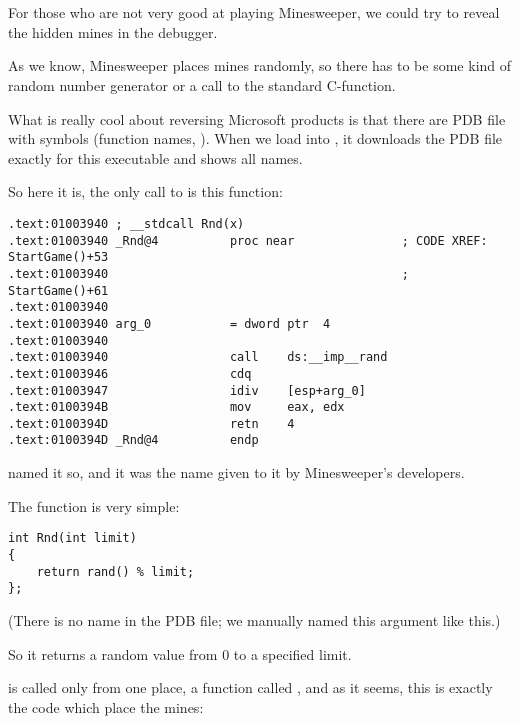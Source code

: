 \section{\MinesweeperWinXPExampleChapterName}
\label{minesweeper_winxp}

For those who are not very good at playing Minesweeper, we could try to reveal the hidden mines in the debugger.


As we know, Minesweeper places mines randomly, so there has to be some kind of random number generator or
a call to the standard  C-function.

What is really cool about reversing Microsoft products is that there are \gls{PDB} 
file with symbols (function names, \etc{}).
When we load  into \IDA, it downloads the 
\gls{PDB} file exactly for this 
executable and shows all names.

So here it is, the only call to  is this function:

\begin{lstlisting}[style=customasmx86]
.text:01003940 ; __stdcall Rnd(x)
.text:01003940 _Rnd@4          proc near               ; CODE XREF: StartGame()+53
.text:01003940                                         ; StartGame()+61
.text:01003940
.text:01003940 arg_0           = dword ptr  4
.text:01003940
.text:01003940                 call    ds:__imp__rand
.text:01003946                 cdq
.text:01003947                 idiv    [esp+arg_0]
.text:0100394B                 mov     eax, edx
.text:0100394D                 retn    4
.text:0100394D _Rnd@4          endp
\end{lstlisting}

\IDA named it so, and it was the name given to it by Minesweeper's developers.

The function is very simple:

\begin{lstlisting}[style=customc]
int Rnd(int limit)
{
    return rand() % limit;
};
\end{lstlisting}

(There is no  name in the \gls{PDB} file; we manually named this argument like this.)

So it returns 
a random value from 0 to a specified limit.

 is called only from one place, 
a function called , 
and as it seems, this is exactly 
the code which place the mines:

